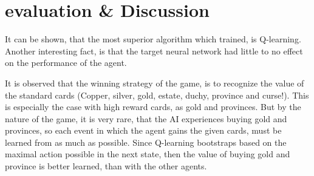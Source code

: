 \chapter{evaluation \& Discussion} \label{ch:eval}

It can be shown, that the most superior algorithm which trained, is Q-learning. Another interesting fact, is that the target neural network had little to no effect on the performance of the agent. 




It is observed that the winning strategy of the game, is to recognize the value of the standard cards (Copper, silver, gold, estate, duchy, province and curse!). This is especially the case with high reward cards, as gold and provinces. But by the nature of the game, it is very rare, that the AI experiences buying gold and provinces, so each event in which the agent gains the given cards, must be learned from as much as possible. Since Q-learning bootstraps based on the maximal action possible in the next state, then the value of buying gold and province is better learned, than with the other agents.
